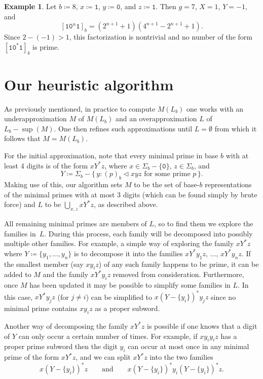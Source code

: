 \documentclass[12pt]{article}
\def\subw{\mathrel{\triangleleft}}
\theoremstyle{plain}
\theoremstyle{definition}
\newtheorem{example}[theorem]{Example}
\newcommand{\0}{\mathtt{0}}
\newcommand{\1}{\mathtt{1}}
\newcommand{\2}{\mathtt{2}}
\newcommand{\3}{\mathtt{3}}
\newcommand{\4}{\mathtt{4}}
\newcommand{\5}{\mathtt{5}}
\newcommand{\6}{\mathtt{6}}
\newcommand{\7}{\mathtt{7}}
\newcommand{\8}{\mathtt{8}}
\newcommand{\9}{\mathtt{9}}
\newcommand{\set}[2]{\{\,#1{}:{}#2\,\}}
\begin{document}
\begin{example}
Let $b\coloneqq8$, $x\coloneqq\1$, $y\coloneqq\0$, and $z\coloneqq\1$.  Then $g=7$, $X=1$, $Y=-1$, and
\[ [\1\0^n\1]_b = (2^{n+1}+1)(4^{n+1}-2^{n+1}+1) . \]
Since $2-(-1)>1$, this factorization is nontrivial and no number of the 
form $[\1\0^*\1]_b$ is prime.
\end{example}

\section{Our heuristic algorithm}\label{secalg}

As previously mentioned, in practice to compute $M(L_b)$ one works with an underapproximation
$M$ of $M(L_b)$ and an overapproximation $L$ of $L_b-\sup(M)$.
One then refines such approximations until $L=\emptyset$ from which it follows that $M=M(L_b)$.

For the initial approximation, note that every minimal prime in base $b$ with at least 4
digits is of the form $x Y^* z$, where $x\in\Sigma_b-\{\0\}$, $z\in\Sigma_b$, and
\[ Y \coloneqq \Sigma_b - \set{y}{\text{$(p)_b\subw xyz$ for some prime $p$}} . \]
Making use of this, our algorithm sets $M$ to be the set of base-$b$ representations
of the minimal primes with at most $3$ digits (which can be found simply by brute force)
and $L$ to be $\bigcup_{x,z}xY^*z$, as described above.

All remaining minimal primes are members of $L$, so to find them we explore the families in~$L$.
During this process, each family will be decomposed into possibly multiple other families.
For example, a simple way of exploring the family $xY^*z$ where $Y\coloneqq\{y_1,\dotsc,y_n\}$ is to decompose it
into the families $xY^*y_1z$, $\dotsc$, $xY^*y_nz$.  If the smallest member (say $xy_iz$)
of any such family happens to be prime, it can be added to $M$ and the family
$xY^*y_iz$ removed from consideration.  Furthermore, once $M$ has been updated it may be possible
to simplify some families in $L$.  In this case, $xY^*y_jz$ (for $j\neq i$) can be simplified to
$x(Y-\{y_i\})^*y_jz$ since no minimal prime contains $xy_iz$ as a proper subword.

Another way of decomposing %
the family $xY^*z$ is possible if one knows that a digit of $Y$ can only occur a certain number
of times.  For example, if $xy_iy_iz$ has a proper prime subword then the digit $y_i$
can occur at most once in any minimal prime of the form $xY^*z$, and we can split $xY^*z$ into
the two families
\[ x(Y-\{y_i\})^*z \qquad\text{and}\qquad x(Y-\{y_i\})^*y_i(Y-\{y_i\})^*z .\]
\end{document}
